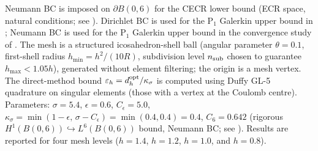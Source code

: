 \documentclass[11pt]{article}
\theoremstyle{plain}
\theoremstyle{definition}
\theoremstyle{remark}
\begin{document}
Neumann BC is imposed on $\partial B(0,6)$ for the CECR lower bound
(ECR space, natural conditions; see ).
Dirichlet BC is used for the $\mathrm{P}_1$ Galerkin upper bound in
; Neumann BC is used for the $\mathrm{P}_1$
Galerkin upper bound in the convergence study of .
The mesh is a structured icosahedron-shell ball
(angular parameter $\theta=0.1$, first-shell radius $h_{\min}=h^2/(10R)$,
subdivision level $n_{\rm sub}$ chosen to guarantee $h_{\max}<1.05h$),
generated without element filtering; the origin is a mesh vertex.
The direct-method bound $\varepsilon_h=d_h^{\rm opt}/\kappa_\sigma$
is computed using Duffy GL-5 quadrature on singular elements (those with
a vertex at the Coulomb centre).
Parameters: $\sigma=5.4$, $\epsilon=0.6$, $C_\epsilon=5.0$,
$\kappa_\sigma=\min(1-\epsilon,\,\sigma-C_\epsilon)=\min(0.4,0.4)=0.4$,
$C_6=0.642$ (rigorous $H^1(B(0,6))\hookrightarrow L^6(B(0,6))$ bound,
Neumann BC; see ).
Results are reported for four mesh levels ($h=1.4$, $h=1.2$, $h=1.0$, and $h=0.8$).
\end{document}
